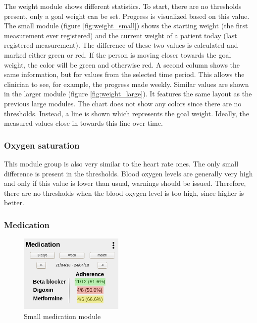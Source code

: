         The weight module shows different statistics. To start, there are no thresholds present, only a goal weight can be set. Progress is visualized based on this value. The small module (figure \ref{fig:weight_small}) shows the starting weight (the first measurement ever registered) and the current weight of a patient today (last registered measurement). The difference of these two values is calculated and marked either green or red. If the person is moving closer towards the goal weight, the color will be green and otherwise red. A second column shows the same information, but for values from the selected time period. This allows the clinician to see, for example, the progress made weekly. Similar values are shown in the larger module (figure \ref{fig:weight_large}). It features the same layout as the previous large modules. The chart does not show any colors since there are no thresholds. Instead, a line is shown which represents the goal weight. Ideally, the measured values close in towards this line over time.

        \subsubsection{Oxygen saturation}

        This module group is also very similar to the heart rate ones. The only small difference is present in the thresholds. Blood oxygen levels are generally very high and only if this value is lower than usual, warnings should be issued. Therefore, there are no thresholds when the blood oxygen level is too high, since higher is better.

        \subsubsection{Medication}

        \begin{figure}[!htb]
            \centering
            \includegraphics[width=0.45\textwidth]{chapters/3_design/mockups/med_small}
            \caption{Small medication module}\label{fig:med_small}
        \end{figure}

